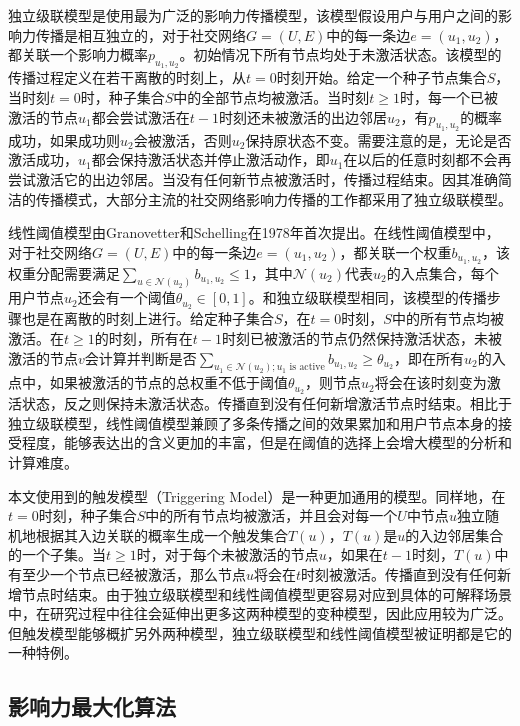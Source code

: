 独立级联模型是使用最为广泛的影响力传播模型，该模型假设用户与用户之间的影响力传播是相互独立的，对于社交网络$G=(U,E)$中的每一条边$e=(u_1,u_2)$，都关联一个影响力概率$p_{u_1,u_2}$。初始情况下所有节点均处于未激活状态。该模型的传播过程定义在若干离散的时刻上，从$t=0$时刻开始。给定一个种子节点集合$S$，当时刻$t=0$时，种子集合$S$中的全部节点均被激活。当时刻$t \ge 1$时，每一个已被激活的节点$u_1$都会尝试激活在$t-1$时刻还未被激活的出边邻居$u_2$，有$p_{u_1,u_2}$的概率成功，如果成功则$u_2$会被激活，否则$u_2$保持原状态不变。需要注意的是，无论是否激活成功，$u_1$都会保持激活状态并停止激活动作，即$u_1$在以后的任意时刻都不会再尝试激活它的出边邻居。当没有任何新节点被激活时，传播过程结束。因其准确简洁的传播模式，大部分主流的社交网络影响力传播的工作都采用了独立级联模型。

线性阈值模型由Granovetter和Schelling在1978年首次提出\cite{granovetter1978threshold}。在线性阈值模型中，对于社交网络$G=(U,E)$中的每一条边$e=(u_1,u_2)$，都关联一个权重$b_{u_1,u_2}$，该权重分配需要满足$\sum_{u \in \mathcal{N}(u_2)}b_{u_1,u_2}\le1$，其中$\mathcal{N}(u_2)$代表$u_2$的入点集合，每个用户节点$u_2$还会有一个阈值$\theta_{u_2} \in [0,1]$。和独立级联模型相同，该模型的传播步骤也是在离散的时刻上进行。给定种子集合$S$，在$t=0$时刻，$S$中的所有节点均被激活。在$t\ge1$的时刻，所有在$t-1$时刻已被激活的节点仍然保持激活状态，未被激活的节点$v$会计算并判断是否$\sum_{u_1 \in \mathcal{N}(u_2);u_1 \text{ is  active}} b_{u_1,u_2} \ge \theta_{u_2}$，即在所有$u_2$的入点中，如果被激活的节点的总权重不低于阈值$\theta_{u_2}$，则节点$u_2$将会在该时刻变为激活状态，反之则保持未激活状态。传播直到没有任何新增激活节点时结束。相比于独立级联模型，线性阈值模型兼顾了多条传播之间的效果累加和用户节点本身的接受程度，能够表达出的含义更加的丰富，但是在阈值的选择上会增大模型的分析和计算难度\cite{chen2013information}。

本文使用到的触发模型（Triggering Model）是一种更加通用的模型。同样地，在$t=0$时刻，种子集合$S$中的所有节点均被激活，并且会对每一个$U$中节点$u$独立随机地根据其入边关联的概率生成一个触发集合$T(u)$，$T(u)$是$u$的入边邻居集合的一个子集。当$t\ge 1$时，对于每个未被激活的节点$u$，如果在$t-1$时刻，$T(u)$中有至少一个节点已经被激活，那么节点$u$将会在$t$时刻被激活。传播直到没有任何新增节点时结束。由于独立级联模型和线性阈值模型更容易对应到具体的可解释场景中，在研究过程中往往会延伸出更多这两种模型的变种模型，因此应用较为广泛。但触发模型能够概扩另外两种模型，独立级联模型和线性阈值模型被证明都是它的一种特例\cite{kempe2003maximizing}。


\subsection{影响力最大化算法}

